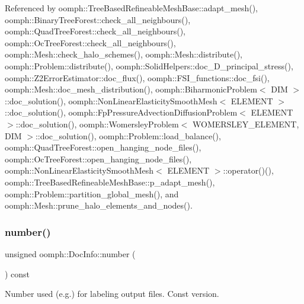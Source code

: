Referenced by oomph\+::\+Tree\+Based\+Refineable\+Mesh\+Base\+::adapt\+\_\+mesh(), oomph\+::\+Binary\+Tree\+Forest\+::check\+\_\+all\+\_\+neighbours(), oomph\+::\+Quad\+Tree\+Forest\+::check\+\_\+all\+\_\+neighbours(), oomph\+::\+Oc\+Tree\+Forest\+::check\+\_\+all\+\_\+neighbours(), oomph\+::\+Mesh\+::check\+\_\+halo\+\_\+schemes(), oomph\+::\+Mesh\+::distribute(), oomph\+::\+Problem\+::distribute(), oomph\+::\+Solid\+Helpers\+::doc\+\_\+D\+\_\+principal\+\_\+stress(), oomph\+::\+Z2\+Error\+Estimator\+::doc\+\_\+flux(), oomph\+::\+F\+S\+I\+\_\+functions\+::doc\+\_\+fsi(), oomph\+::\+Mesh\+::doc\+\_\+mesh\+\_\+distribution(), oomph\+::\+Biharmonic\+Problem$<$ D\+I\+M $>$\+::doc\+\_\+solution(), oomph\+::\+Non\+Linear\+Elasticity\+Smooth\+Mesh$<$ E\+L\+E\+M\+E\+N\+T $>$\+::doc\+\_\+solution(), oomph\+::\+Fp\+Pressure\+Advection\+Diffusion\+Problem$<$ E\+L\+E\+M\+E\+N\+T $>$\+::doc\+\_\+solution(), oomph\+::\+Womersley\+Problem$<$ W\+O\+M\+E\+R\+S\+L\+E\+Y\+\_\+\+E\+L\+E\+M\+E\+N\+T, D\+I\+M $>$\+::doc\+\_\+solution(), oomph\+::\+Problem\+::load\+\_\+balance(), oomph\+::\+Quad\+Tree\+Forest\+::open\+\_\+hanging\+\_\+node\+\_\+files(), oomph\+::\+Oc\+Tree\+Forest\+::open\+\_\+hanging\+\_\+node\+\_\+files(), oomph\+::\+Non\+Linear\+Elasticity\+Smooth\+Mesh$<$ E\+L\+E\+M\+E\+N\+T $>$\+::operator()(), oomph\+::\+Tree\+Based\+Refineable\+Mesh\+Base\+::p\+\_\+adapt\+\_\+mesh(), oomph\+::\+Problem\+::partition\+\_\+global\+\_\+mesh(), and oomph\+::\+Mesh\+::prune\+\_\+halo\+\_\+elements\+\_\+and\+\_\+nodes().

\mbox{\label{classoomph_1_1DocInfo_a2a09b3c3e22fd874570ffc97b0610874}} 
\subsubsection{\texorpdfstring{number()}{number()}\hspace{0.1cm}{\footnotesize\ttfamily [2/2]}}
{\footnotesize\ttfamily unsigned oomph\+::\+Doc\+Info\+::number (\begin{DoxyParamCaption}{ }\end{DoxyParamCaption}) const\hspace{0.3cm}{\ttfamily [inline]}}



Number used (e.\+g.) for labeling output files. Const version. 



